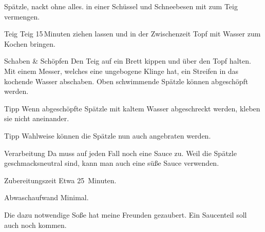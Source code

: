 \begin{recipe}{Spätzle, nackt ohne alles.}
 in einer Schüssel und Schneebesen mit
 zum Teig vermengen.
\item[Teig] Teig 15\,Minuten ziehen lassen und in der Zwischenzeit Topf mit Wasser zum Kochen bringen. 
\item[Schaben \& Schöpfen] Den Teig auf ein Brett kippen und über den Topf halten. Mit einem Messer, welches eine ungebogene Klinge hat, ein Streifen in das kochende Wasser abschaben. Oben schwimmende Spätzle können abgeschöpft werden. 
\item[Tipp] Wenn abgeschöpfte Spätzle mit kaltem Wasser abgeschreckt werden, kleben sie nicht aneinander.
\item[Tipp] Wahlweise können die Spätzle nun auch angebraten werden.
\item[Verarbeitung] Da muss auf jeden Fall noch eine Sauce zu. Weil die Spätzle geschmacksneutral sind, kann man auch eine süße Sauce verwenden.
\item[Zubereitungszeit] Etwa 25~Minuten.
\item[Abwaschaufwand] Minimal.
\item Die dazu notwendige Soße hat meine Freunden gezaubert. Ein Saucenteil soll auch noch kommen.
\end{recipe}
